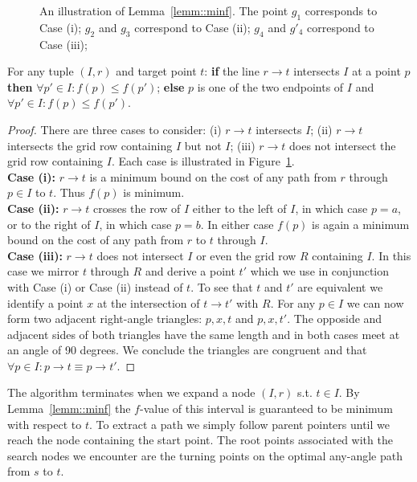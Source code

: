 \begin{figure}[tb]
  \begin{center}
    
  \end{center}
  \caption{An illustration of Lemma~\ref{lemm::minf}. The point $g_1$ corresponds 
to Case (i); $g_2$ and $g_3$ correspond to Case (ii); $g_4$ and $g'_4$ correspond
to Case (iii);}
\label{fig::minf}
\end{figure}

\begin{lemm}
\label{lemm::minf}
For any tuple $(I, r)$ and target point $t$: 
\textbf{if} the line $r \rightarrow t$ intersects $I$ at a point
$p$ \textbf{then} $\forall p' \in I: f(p) \leq f(p')$;
\textbf{else}
$p$ is one of the two endpoints of $I$ and 
$\forall p' \in I: f(p) \leq f(p')$.
\end{lemm}
\begin{proof}
There are three cases to consider:
(i) $r \rightarrow t$ intersects $I$; (ii) $r \rightarrow t$ intersects
the grid row containing $I$ but not $I$; (iii) $r \rightarrow t$ does 
not intersect the grid row containing $I$. Each
case is illustrated in Figure~\ref{fig::minf}.
\\
\textbf{Case (i):} $r \rightarrow t$ is a minimum bound on the cost of any
path from $r$ through $p \in I$ to $t$. Thus $f(p)$ is minimum.
\\
\textbf{Case (ii):} $r \rightarrow t$ crosses the row of $I$ 
either to the left of $I$, in which
case $p = a$, or to the right of $I$, in which case $p = b$.
In either case $f(p)$ is again a minimum bound on the cost of any
path from $r$ to $t$ through $I$.
\\
\textbf{Case (iii):} $r \rightarrow t$ does not intersect $I$ 
or even the grid row $R$ containing $I$. In this case we mirror
$t$ through $R$ and derive a point $t'$ which we use in
conjunction with Case (i) or Case (ii) instead of $t$.
To see that $t$ and $t'$ are equivalent we identify 
a point $x$ at the intersection of $t \rightarrow t'$ with $R$. 
For any $p \in I$ we can now form two adjacent right-angle
triangles: $p, x, t$ and $p, x, t'$. The opposide and adjacent 
sides of both triangles have the same length and in both cases 
meet at an angle of 90 degrees. We conclude the triangles are
congruent and that 
$\forall p \in I: p \rightarrow t \equiv p \rightarrow t'$.
\end{proof}

The algorithm terminates when we expand a node $(I, r)$ s.t.
$t \in I$. By Lemma~\ref{lemm::minf} the $f$-value of this
interval is guaranteed to be minimum with respect to $t$.
To extract a path we simply follow parent pointers until we
reach the node containing the start point.
The root points associated with the search nodes we encounter
are the turning points on the optimal any-angle path from 
$s$ to $t$. 

